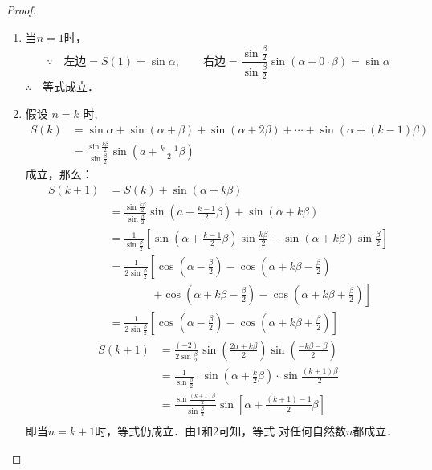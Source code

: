 \begin{proof}
\begin{enumerate}
    \item 当$n=1$时，
\[\because\quad \text{左边}=S(1)=\sin\alpha,\qquad \text{右边}=\frac{\sin\frac{\beta}{2}}{\sin\frac{\beta}{2}}\sin(\alpha+0\cdot \beta)=\sin\alpha\]
$\therefore\quad $等式成立．

\item 假设 $n=k$ 时,
\[\begin{split}
    S(k)&=\sin \alpha+\sin (\alpha+\beta)+\sin (\alpha+2 \beta)+\cdots+\sin (\alpha+(k-1) \beta) \\
&=\frac{\sin \frac{k \beta}{2}}{\sin \frac{\beta}{2}} \sin \left(a+\frac{k-1}{2} \beta\right)
\end{split}\]
成立，那么：
\[\begin{split}
    S(k+1)&= S(k)+\sin(\alpha+k\beta)\\
    &=\frac{\sin \frac{k \beta}{2}}{\sin \frac{\beta}{2}} \sin \left(a+\frac{k-1}{2} \beta\right)+\sin(\alpha+k\beta)\\
    &=\frac{1}{\sin \frac{\beta}{2}}\left[\sin\left(\alpha+\frac{k-1}{2}\beta\right)\sin\frac{k\beta}{2}+\sin(\alpha+k\beta)\sin\frac{\beta}{2}\right]\\
    &=\frac{1}{2\sin \frac{\beta}{2}}\left[\cos\left(\alpha-\frac{\beta}{2}\right)-\cos\left(\alpha+k\beta-\frac{\beta}{2}\right)\right. \\
    &\qquad \qquad \left. +\cos\left(\alpha+k\beta -\frac{\beta}{2}\right)-\cos\left(\alpha+k\beta+\frac{\beta}{2}\right)\right]\\
    &=\frac{1}{2\sin \frac{\beta}{2}}\left[\cos\left(\alpha-\frac{\beta}{2}\right)-\cos\left(\alpha+k\beta+\frac{\beta}{2}\right)\right]
\end{split}\]
\[\begin{split}
    S(k+1)&= \frac{(-2)}{2\sin \frac{\beta}{2}}\sin\left(\frac{2\alpha+k\beta}{2}\right)\sin\left(\frac{-k\beta-\beta}{2}\right)\\
    &=\frac{1}{\sin \frac{\beta}{2}}\cdot \sin\left(\alpha+\frac{k}{2}\beta\right)\cdot \sin\frac{(k+1)\beta}{2}\\
    &=\frac{\sin \frac{(k+1)\beta}{2}}{\sin \frac{\beta}{2}}\sin\left[\alpha+\frac{(k+1)-1}{2}\beta\right]\\
\end{split}\]
即当$n=k+1$时，等式仍成立．由1和2可知，等式
对任何自然数$n$都成立．
\end{enumerate}
\end{proof}


